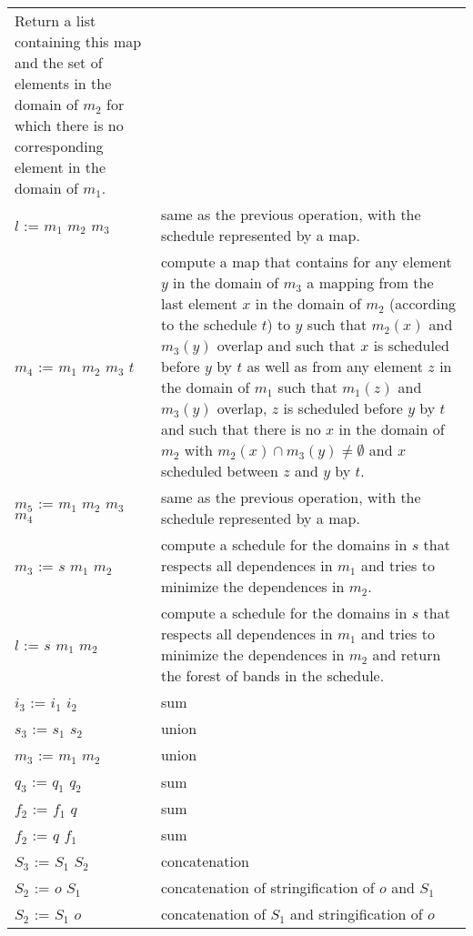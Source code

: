 \begin{supertabular}{p{0.35\textwidth}p{0.6\textwidth}}
Return a list containing this map and the set of elements in the domain of
$m_2$ for which there is no corresponding element in the domain of $m_1$.
\\
$l$ :=  $m_1$  $m_2$  $m_3$ &
same as the previous operation, with the schedule represented by a map.
\\
$m_4$ :=  $m_1$  $m_2$  $m_3$
 $t$ &
compute a map that contains for any element $y$ in the domain of $m_3$
a mapping from the last element $x$ in the domain of $m_2$
(according to the schedule $t$) to $y$
such that $m_2(x)$ and $m_3(y)$ overlap
and such that $x$ is scheduled before $y$ by $t$
as well as from any element $z$ in the domain of $m_1$ such that
$m_1(z)$ and $m_3(y)$ overlap,
$z$ is scheduled before $y$ by $t$
and such that there is no $x$ in the domain of $m_2$ with
$m_2(x) \cap m_3(y) \ne \emptyset$ and
$x$ scheduled between $z$ and $y$ by $t$.
\\
$m_5$ :=  $m_1$  $m_2$  $m_3$
 $m_4$ &
same as the previous operation, with the schedule represented by a map.
\\
$m_3$ :=  $s$  $m_1$  $m_2$ &
compute a schedule for the domains in $s$ that respects all dependences
in $m_1$ and tries to minimize the dependences in $m_2$.
\\
$l$ :=  $s$  $m_1$  $m_2$ &
compute a schedule for the domains in $s$ that respects all dependences
in $m_1$ and tries to minimize the dependences in $m_2$ and return
the forest of bands in the schedule.
\\
$i_3$ := $i_1$ \ai{$+$} $i_2$ & sum
\\
$s_3$ := $s_1$ \ai{$+$} $s_2$ & union
\\
$m_3$ := $m_1$ \ai{$+$} $m_2$ & union
\\
$q_3$ := $q_1$ \ai{$+$} $q_2$ & sum
\\
$f_2$ := $f_1$ \ai{$+$} $q$ & sum
\\
$f_2$ := $q$ \ai{$+$} $f_1$ & sum
\\
$S_3$ := $S_1$ \ai{$+$} $S_2$ & concatenation
\\
$S_2$ := $o$ \ai{$+$} $S_1$ &
concatenation of stringification of $o$ and $S_1$
\\
$S_2$ := $S_1$ \ai{$+$} $o$ &
concatenation of $S_1$ and stringification of $o$
\\

\end{supertabular}
